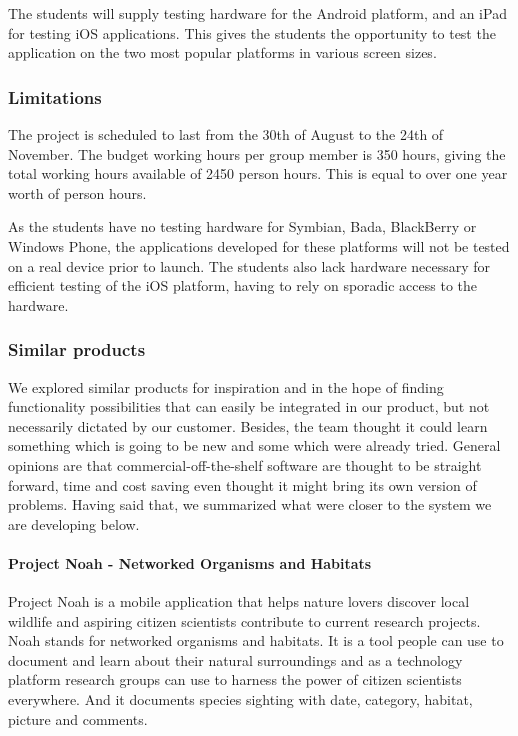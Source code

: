 The students will supply testing hardware for the Android platform, and an iPad
for testing iOS applications. This gives the students the opportunity to test
the application on the two most popular platforms in various screen sizes.

\subsubsection{Limitations}
The project is scheduled to last from the 30th of August to the 24th of
November. The budget working hours per group member is 350 hours, giving the
total working hours available of 2450 person hours. This is equal to over one
year worth of person hours.

As the students have no testing hardware for Symbian, Bada, BlackBerry or
Windows Phone, the applications developed for these platforms will not be
tested on a real device prior to launch. The students also lack hardware
necessary for efficient testing of the iOS platform, having to rely on sporadic
access to the hardware.

\subsubsection{Similar products}
We explored similar products for inspiration and in the hope of finding functionality possibilities that can easily be integrated in our product, but not necessarily dictated by our customer. Besides, the team thought it could learn something which is going to be new and some which were already tried. General opinions are that commercial-off-the-shelf software are thought to be straight forward, time and cost saving even thought it might bring its own version of problems\cite{similarproduct:introdn}. Having said that, we summarized what were closer to the system we are developing below.
\paragraph{Project Noah - Networked Organisms and Habitats}

Project Noah is a mobile application that helps nature lovers discover local wildlife and aspiring citizen scientists contribute to current research  projects. Noah stands for networked organisms and habitats. It is a tool people can use to document and learn about their  natural surroundings and as a technology platform research groups can  use to harness the power of citizen scientists everywhere. And it documents species sighting with date, category, habitat, picture and comments\cite{similarproduct:noah}.

